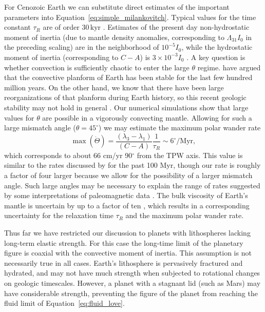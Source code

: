 \documentclass[preprint,12pt,authoryear]{elsarticle}
\begin{document}
For Cenozoic Earth we can substitute direct estimates of the important parameters into Equation~\eqref{eq:simple_milankovitch}.
Typical values for the time constant $\tau_R$ are of order $30 \, \mathrm{kyr}$ \citep{ricard1993polar}.
Estimates of the present day non-hydrostatic moment of inertia (due to mantle density anomalies, corresponding to $\Lambda_{31}I_0$ in the preceding scaling)
are in the neighborhood of $10^{-5} I_0$, while the hydrostatic moment of inertia (corresponding to $C-A$) is $3 \times 10^{-3} I_0$ \citep{chambat2001mean}.
A key question is whether convection is sufficiently chaotic to enter the large $\theta$ regime. 
\citet{richards1997explanation} have argued that the convective planform of Earth has been stable for the last
few hundred million years. On the other hand, we know that there have been large reorganizations of that planform 
during Earth history, so this recent geologic stability may not hold in general \citep{evans2003true}.
Our numerical simulations show that large values for $\theta$ are possible in a vigorously convecting mantle.
Allowing for such a large mismatch angle ($\theta = 45^\circ$) we may estimate the maximum polar wander rate
\begin{equation}
\max ( \dot{\Theta} ) = \frac{(\lambda_3-\lambda_1)}{(C-A)}\frac{1}{\tau_R} \sim 6^\circ / \mathrm{Myr},
\end{equation}
which corresponds to about 66 cm/yr 90$^\circ$ from the TPW axis.
This value is similar to the rates discussed by \citet{cambiotti2011new} for the past 100 Myr, though our rate is roughly a factor of four larger because we allow for the
possibility of a larger mismatch angle. Such large angles may be necessary to explain the range of rates suggested by some interpretations of paleomagnetic data \citep{mitchell2011sutton}.
The bulk viscosity of Earth's mantle is uncertain by up to a factor of ten \citep{mitrovica2004new},
which results in a corresponding uncertainty for the relaxation time $\tau_R$ and the maximum polar wander rate.

Thus far we have restricted our discussion to planets with lithospheres lacking long-term elastic strength.
For this case the long-time limit of the planetary figure is coaxial with the convective 
moment of inertia. This assumption is not necessarily true in all cases.
Earth's lithosphere is pervasively fractured and hydrated, and may not have much strength when subjected to rotational changes on geologic timescales.
However, a planet with a stagnant lid (such as Mars) may have considerable strength, preventing the figure of the planet 
from reaching the fluid limit of Equation~\eqref{eq:fluid_love}.
\end{document}
